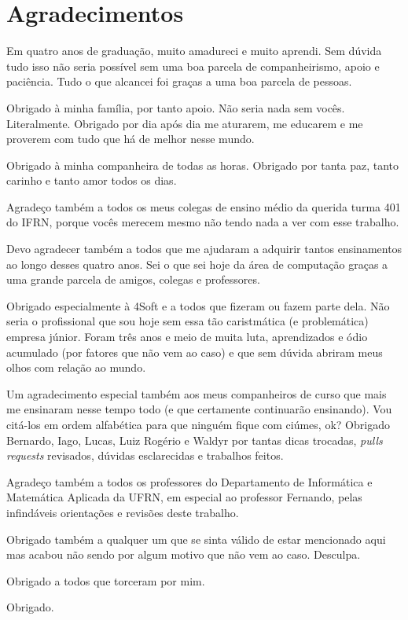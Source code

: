 
\chapter*{Agradecimentos}

Em quatro anos de graduação, muito amadureci e muito aprendi. Sem dúvida tudo isso não seria possível sem uma boa parcela de companheirismo, apoio e paciência. Tudo o que alcancei foi graças a uma boa parcela de pessoas.

Obrigado à minha família, por tanto apoio. Não seria nada sem vocês. Literalmente. Obrigado por dia após dia me aturarem, me educarem e me proverem com tudo que há de melhor nesse mundo.

Obrigado à minha companheira de todas as horas. Obrigado por tanta paz, tanto carinho e tanto amor todos os dias.

Agradeço também a todos os meus colegas de ensino médio da querida turma 401 do IFRN, porque vocês merecem mesmo não tendo nada a ver com esse trabalho.

Devo agradecer também a todos que me ajudaram a adquirir tantos ensinamentos ao longo desses quatro anos. Sei o que sei hoje da área de computação graças a uma grande parcela de amigos, colegas e professores.

Obrigado especialmente à 4Soft e a todos que fizeram ou fazem parte dela. Não seria o profissional que sou hoje sem essa tão caristmática (e problemática) empresa júnior. Foram três anos e meio de muita luta, aprendizados e ódio acumulado (por fatores que não vem ao caso) e que sem dúvida abriram meus olhos com relação ao mundo.

Um agradecimento especial também aos meus companheiros de curso que mais me ensinaram nesse tempo todo (e que certamente continuarão ensinando). Vou citá-los em ordem alfabética para que ninguém fique com ciúmes, ok? Obrigado Bernardo, Iago, Lucas, Luiz Rogério e Waldyr por tantas dicas trocadas, \textit{pulls requests} revisados, dúvidas esclarecidas e trabalhos feitos.

Agradeço também a todos os professores do Departamento de Informática e Matemática Aplicada da UFRN, em especial ao professor Fernando, pelas infindáveis orientações e revisões deste trabalho.

Obrigado também a qualquer um que se sinta válido de estar mencionado aqui mas acabou não sendo por algum motivo que não vem ao caso. Desculpa.

Obrigado a todos que torceram por mim.

Obrigado.
